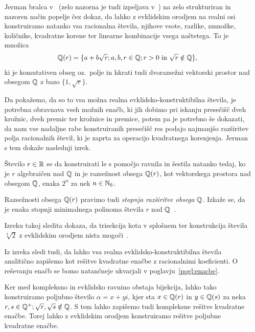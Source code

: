 Jerman bralca v~\cite{jerman1998} (zelo nazorna je tudi izpeljava v~\cite[str.165--170]{michael2005}) na zelo strukturiran in nazoren način popelje čez dokaz, da lahko z evklidskim orodjem na realni osi konstruiramo natanko vsa racionalna števila, njihove vsote, razlike, zmnožke, količnike, kvadratne korene ter linearne kombinacije vsega naštetega. To je množica
$$
    \mathbb Q(r) = \{ a + b \sqrt{r}; a, b, r \in \mathbb Q; r > 0 \text{ in } \sqrt{r} \notin \mathbb Q \},
$$
ki je komutativen obseg oz.\ polje in hkrati tudi dvorazsežni vektorski prostor nad obsegom $\mathbb Q$ z bazo $ \{1, \sqrt{r} \} $.

Da pokažemo, da so to vsa možna realna evklidsko-konstruktibilna števila, je potrebna obravnava vseh možnih enačb, ki jih dobimo pri iskanju presečišč dveh krožnic, dveh premic ter krožnice in premice, potem pa je potrebno še dokazati, da nam vse nadaljne rabe konstruiranih presečišč res podajo najmanjšo razširitev polja racionalnih števil, ki je zaprta za operacijo kvadratnega korenjenja. Jerman s tem dokaže naslednji izrek.

\begin{izrek}
    \label{izr:evkl_konstr}
    Število $r \in \mathbb R$ se da konstruirati le s pomočjo ravnila in šestila natanko tedaj, ko je $r$ algebraičen nad $\mathbb Q$ in je razsežnost obsega $\mathbb Q(r)$, kot vektorskega prostora nad obsegom $\mathbb Q$, enaka $2^n$ za nek $n \in \mathbb N_0$.
\end{izrek}

\begin{opomba}
    \label{op:razseznost_obsega_evkl}
    Razsežnosti obsega $\mathbb Q(r)$ pravimo tudi \emph{stopnja razširitve obsega $\mathbb Q$}. Izkaže se, da je enaka stopnji minimalnega polinoma števila $r$ nad $\mathbb Q$~\cite[str.\ 77]{jerman1998}.
\end{opomba}

Izreku takoj sledita dokaza, da trisekcija kota v splošnem ter konstrukcija števila $ \sqrt[3]{2} $ z evklidskim orodjem nista mogoči~\cite[str.\ 77--78]{jerman1998}.

Iz izreka sledi tudi, da lahko vsa realna evklidsko-konstruktibilna števila analitično zapišemo kot rešitve kvadratne enačbe z racionalnimi koeficienti. O reševanju enačb se bomo natančneje ukvarjali v poglavju~\ref{pogl:enacbe}.

Ker med kompleksno in evklidsko ravnino obstaja bijekcija, lahko tako konstruiramo poljubno število $\alpha = x + y i$, kjer sta $x \in \mathbb Q(r)$ in $y \in \mathbb Q(s)$ za neka $r, s \in \mathbb Q^+; \sqrt{r}, \sqrt{s} \notin \mathbb Q$. S tem lahko zapišemo tudi kompleksne rešitve kvadratne enačbe. Torej lahko z evklidskim orodjem konstruiramo rešitve poljubne kvadratne enačbe.

